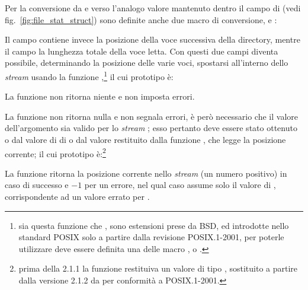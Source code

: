 Per la conversione da e verso l'analogo valore mantenuto dentro il campo
 di  (vedi fig.~\ref{fig:file_stat_struct}) sono
definite anche due macro di conversione,  e :

{\centering
\vspace{3pt}
\begin{funcbox}{
} 
\end{funcbox}
}

Il campo  contiene invece la posizione della voce successiva della
directory, mentre il campo  la lunghezza totale della voce
letta. Con questi due campi diventa possibile, determinando la posizione delle
varie voci, spostarsi all'interno dello \textit{stream} usando la funzione
,\footnote{sia questa funzione che , sono
  estensioni prese da BSD, ed introdotte nello standard POSIX solo a partire
  dalla revisione POSIX.1-2001, per poterle utilizzare deve essere definita
  una delle macro ,  o
  .} il cui prototipo è:

\begin{funcproto}{
}
{La funzione non ritorna niente e non imposta errori.}
\end{funcproto}

La funzione non ritorna nulla e non segnala errori, è però necessario che il
valore dell'argomento  sia valido per lo
\textit{stream} ; esso pertanto deve essere stato ottenuto o dal
valore di  di  o dal valore restituito dalla
funzione , che legge la posizione corrente; il cui prototipo
è:\footnote{prima della  2.1.1 la funzione restituiva un valore di
  tipo , sostituito a partire dalla versione 2.1.2 da 
  per conformità a POSIX.1-2001.}

\begin{funcproto}{
}
{La funzione ritorna la posizione corrente nello \textit{stream} (un numero
  positivo) in caso di successo e $-1$ per un errore, nel qual caso
   assume solo il valore di , corrispondente ad un
  valore errato per .  }
\end{funcproto}

